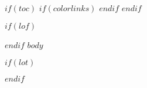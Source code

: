 
$if(toc)$
{
$if(colorlinks)$
\hypersetup{linkcolor=$if(toccolor)$$toccolor$$else$black$endif$}
$endif$
\setcounter{tocdepth}{2}
\tableofcontents
}
$endif$

\newpage

$if(lof)$
\listoffigures
$endif$
$body$

\newpage

$if(lot)$
\listoftables
$endif$

